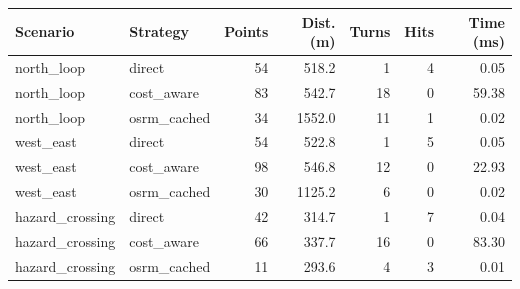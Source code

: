 \begin{tabular}{llrrrrr}
\hline
Scenario & Strategy & Points & Dist. (m) & Turns & Hits & Time (ms) \\
\hline
north\_loop & direct & 54 & 518.2 & 1 & 4 & 0.05 \\
north\_loop & cost\_aware & 83 & 542.7 & 18 & 0 & 59.38 \\
north\_loop & osrm\_cached & 34 & 1552.0 & 11 & 1 & 0.02 \\
west\_east & direct & 54 & 522.8 & 1 & 5 & 0.05 \\
west\_east & cost\_aware & 98 & 546.8 & 12 & 0 & 22.93 \\
west\_east & osrm\_cached & 30 & 1125.2 & 6 & 0 & 0.02 \\
hazard\_crossing & direct & 42 & 314.7 & 1 & 7 & 0.04 \\
hazard\_crossing & cost\_aware & 66 & 337.7 & 16 & 0 & 83.30 \\
hazard\_crossing & osrm\_cached & 11 & 293.6 & 4 & 3 & 0.01 \\
\hline
\end{tabular}
